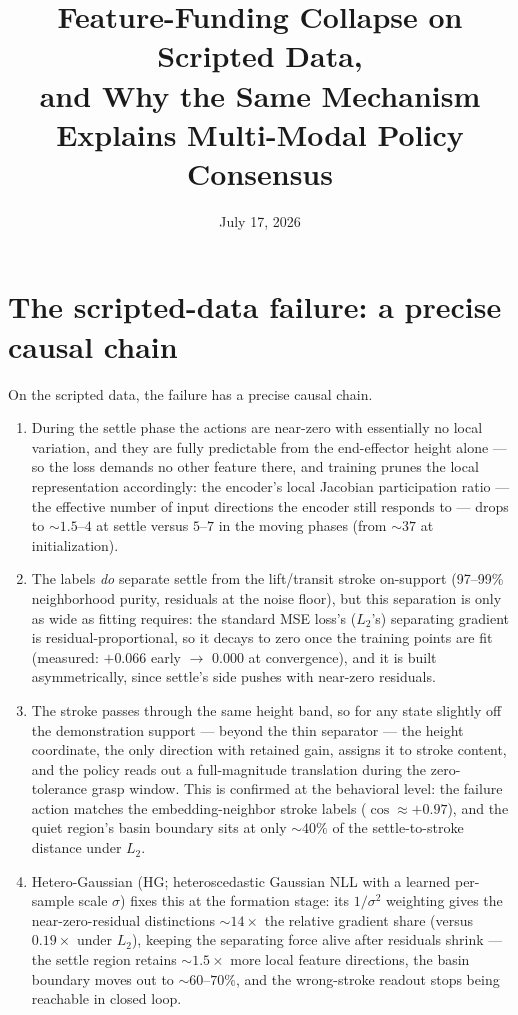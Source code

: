 \documentclass[11pt]{article}
\title{\vspace{-2em}\large\textbf{Feature-Funding Collapse on Scripted Data,\\ and Why the Same Mechanism Explains Multi-Modal Policy Consensus}}
\date{\normalsize July 17, 2026}
\author{}
\begin{document}
\maketitle
\vspace{-3em}

\section*{The scripted-data failure: a precise causal chain}

On the scripted data, the failure has a precise causal chain.

\begin{enumerate}[leftmargin=1.6em,itemsep=0.35em]
\item During the settle phase the actions are near-zero with essentially no local
variation, and they are fully predictable from the end-effector height alone ---
so the loss demands no other feature there, and training prunes the local
representation accordingly: the encoder's local Jacobian participation ratio --- the effective number of
input directions the encoder still responds to --- drops to ${\sim}1.5$--$4$ at settle versus $5$--$7$ in the moving phases
(from ${\sim}37$ at initialization).

\item The labels \emph{do} separate settle from the lift/transit stroke
on-support (97--99\% neighborhood purity, residuals at the noise floor), but
this separation is only as wide as fitting requires: the standard MSE loss's ($L_2$'s) separating
gradient is residual-proportional, so it decays to zero once the training
points are fit (measured: $+0.066$ early $\rightarrow$ $0.000$ at
convergence), and it is built asymmetrically, since settle's side pushes with
near-zero residuals.

\item The stroke passes through the same height band, so for any state
slightly off the demonstration support --- beyond the thin separator --- the
height coordinate, the only direction with retained gain, assigns it to
stroke content, and the policy reads out a full-magnitude translation during
the zero-tolerance grasp window. This is confirmed at the behavioral level:
the failure action matches the embedding-neighbor stroke labels
($\cos \approx +0.97$), and the quiet region's basin boundary sits at only
${\sim}40\%$ of the settle-to-stroke distance under $L_2$.

\item Hetero-Gaussian (HG; heteroscedastic Gaussian NLL with a learned per-sample scale $\sigma$) fixes this at the formation stage: its $1/\sigma^2$
weighting gives the near-zero-residual distinctions ${\sim}14\times$ the
relative gradient share (versus $0.19\times$ under $L_2$), keeping the
separating force alive after residuals shrink --- the settle region retains
${\sim}1.5\times$ more local feature directions, the basin boundary moves out
to ${\sim}60$--$70\%$, and the wrong-stroke readout stops being reachable in
closed loop.
\end{enumerate}
\end{document}
